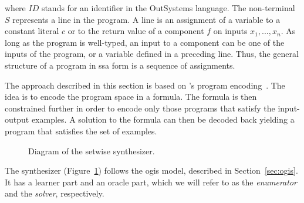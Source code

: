 \noindent
where $ID$ stands for an identifier in the OutSystems language. The non-terminal
$S$ represents a line in the program. A line is an assignment of a variable to a
constant literal $c$ or to the return value of a component $f$ on inputs $x_1,
..., x_n$. As long as the program is well-typed, an input to a component can
be one of the inputs of the program, or a variable defined in a preceding line.
Thus, the general structure of a program in \gls{ssa} form is a sequence of
assignments.

The approach described in this section is based on
\citeauthor{Jha:oracle:2010}'s program encoding~\cite{Jha:oracle:2010}.
The idea is to encode the program space in a formula.
The formula is then constrained further in order to encode only those programs
that satisfy the input-output examples.
A solution to the formula can then be decoded back yielding a program that
satisfies the set of examples.

\begin{figure}
  \centering

  \caption{Diagram of the setwise synthesizer.}
  \label{fig:synth-setwise}
\end{figure}

The synthesizer (Figure~\ref{fig:synth-setwise}) follows the \gls{ogis} model,
described in Section~\ref{sec:ogis}. It has a learner part and an oracle part,
which we will refer to as the \textit{enumerator} and the \textit{solver},
respectively.

